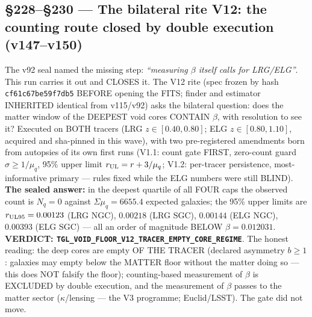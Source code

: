 \documentclass[11pt]{article}
\theoremstyle{definition}\newtheorem{deriv}{Derivation}
\begin{document}
\subsection*{\S228--\S230 --- The bilateral rite V12: the counting route closed by double execution (v147--v150)}The v92 seal named the missing step: \emph{``measuring $\beta$ itself calls for LRG/ELG''}. This run carries it out and CLOSES it. The V12 rite (spec frozen by hash \texttt{cf61c67be59f7db5} BEFORE opening the FITS; finder and estimator INHERITED identical from v115/v92) asks the bilateral question: does the matter window of the DEEPEST void cores CONTAIN $\beta$, with resolution to see it? Executed on BOTH tracers (LRG $z\in[0.40,0.80]$; ELG $z\in[0.80,1.10]$, acquired and sha-pinned in this wave), with two pre-registered amendments born from autopsies of its own first runs (V1.1: count gate FIRST, zero-count guard $\sigma\ge1/\mu_q$, 95\% upper limit $r_{\rm UL}=r+3/\mu_q$; V1.2: per-tracer persistence, most-informative primary --- rules fixed while the ELG numbers were still BLIND). \textbf{The sealed answer:} in the deepest quartile of all FOUR caps the observed count is $N_q=0$ against $\Sigma\mu_q=6655.4$ expected galaxies; the 95\% upper limits are $r_{\rm UL95}=0.00123$ (LRG NGC), $0.00218$ (LRG SGC), $0.00144$ (ELG NGC), $0.00393$ (ELG SGC) --- all an order of magnitude BELOW $\beta=0.012031$. \textbf{VERDICT: \texttt{TGL\_VOID\_FLOOR\_V12\_TRACER\_EMPTY\_CORE\_REGIME}}. The honest reading: the deep cores are empty OF THE TRACER (declared asymmetry $b\ge1$: galaxies may empty below the MATTER floor without the matter doing so --- this does NOT falsify the floor); counting-based measurement of $\beta$ is EXCLUDED by double execution, and the measurement of $\beta$ passes to the matter sector ($\kappa$/lensing --- the V3 programme; Euclid/LSST). The gate did not move.
\end{document}
